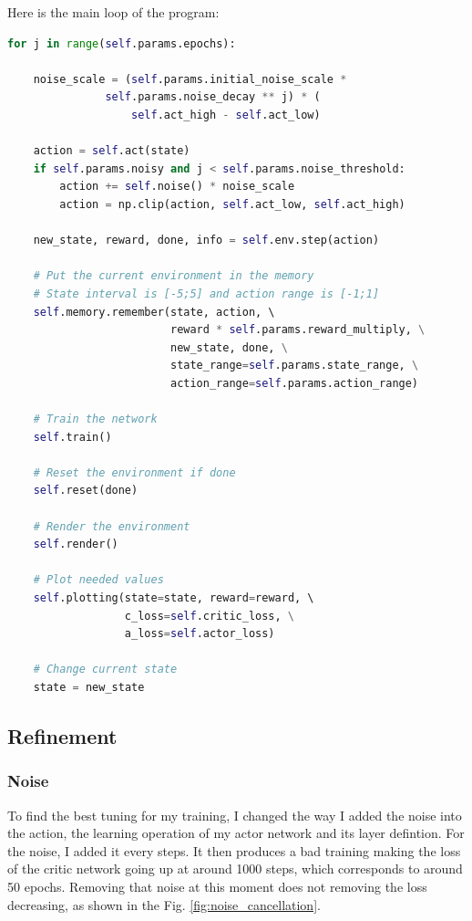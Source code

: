 \documentclass{article}
\begin{document}
Here is the main loop of the program:

\begin{lstlisting}[language=Python]
for j in range(self.params.epochs):

    noise_scale = (self.params.initial_noise_scale *
               self.params.noise_decay ** j) * (
                   self.act_high - self.act_low)

    action = self.act(state)
    if self.params.noisy and j < self.params.noise_threshold:
        action += self.noise() * noise_scale
        action = np.clip(action, self.act_low, self.act_high)

    new_state, reward, done, info = self.env.step(action)

    # Put the current environment in the memory
    # State interval is [-5;5] and action range is [-1;1]
    self.memory.remember(state, action, \ 
                         reward * self.params.reward_multiply, \
                         new_state, done, \
                         state_range=self.params.state_range, \
                         action_range=self.params.action_range)

    # Train the network
    self.train()

    # Reset the environment if done
    self.reset(done)

    # Render the environment
    self.render()

    # Plot needed values
    self.plotting(state=state, reward=reward, \ 
                  c_loss=self.critic_loss, \
                  a_loss=self.actor_loss)

    # Change current state
    state = new_state
\end{lstlisting}


\subsection{Refinement}

\subsubsection{Noise}

To find the best tuning for my training, I changed the way I added the noise
into the action, the learning operation of my actor network and its layer
defintion. For the noise, I added it every steps. It then produces a bad
training making the loss of the critic network going up at around 1000 steps,
which corresponds to around 50 epochs. Removing that noise at this moment does
not removing the loss decreasing, as shown in the Fig. \ref{fig:noise_cancellation}.
\end{document}
